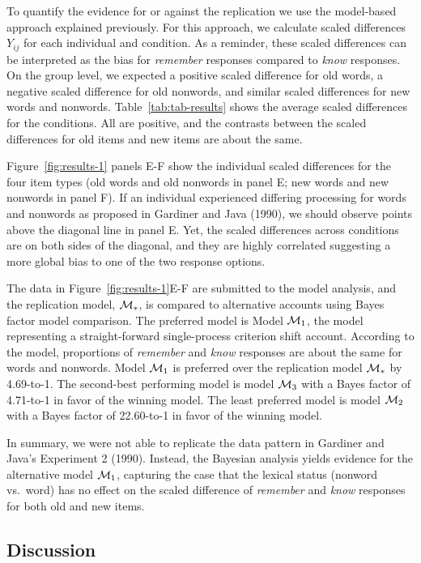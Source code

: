 \documentclass[english,,man]{apa6}
\begin{document}
To quantify the evidence for or against the replication we use the model-based approach explained previously. For this approach, we calculate scaled differences \(Y_{ij}\) for each individual and condition. As a reminder, these scaled differences can be interpreted as the bias for \emph{remember} responses compared to \emph{know} responses. On the group level, we expected a positive scaled difference for old words, a negative scaled difference for old nonwords, and similar scaled differences for new words and nonwords. Table~\ref{tab:tab-results} shows the average scaled differences for the conditions. All are positive, and the contrasts between the scaled differences for old items and new items are about the same.

Figure~\ref{fig:results-1} panels E-F show the individual scaled differences for the four item types (old words and old nonwords in panel E; new words and new nonwords in panel F). If an individual experienced differing processing for words and nonwords as proposed in Gardiner and Java (1990), we should observe points above the diagonal line in panel E. Yet, the scaled differences across conditions are on both sides of the diagonal, and they are highly correlated suggesting a more global bias to one of the two response options.

The data in Figure~\ref{fig:results-1}E-F are submitted to the model analysis, and the replication model, \({\cal M}_{*}\), is compared to alternative accounts using Bayes factor model comparison. The preferred model is Model \({\cal M}_{1}\), the model representing a straight-forward single-process criterion shift account. According to the model, proportions of \emph{remember} and \emph{know} responses are about the same for words and nonwords. Model \({\cal M}_{1}\) is preferred over the replication model \({\cal M}_{*}\) by 4.69-to-1. The second-best performing model is model \({\cal M}_3\) with a Bayes factor of 4.71-to-1 in favor of the winning model. The least preferred model is model \({\cal M}_2\) with a Bayes factor of 22.60-to-1 in favor of the winning model.

In summary, we were not able to replicate the data pattern in Gardiner and Java's Experiment 2 (1990). Instead, the Bayesian analysis yields evidence for the alternative model \({\cal M}_1\), capturing the case that the lexical status (nonword vs.~word) has no effect on the scaled difference of \emph{remember} and \emph{know} responses for both old and new items.

\hypertarget{discussion}{%
\subsection{Discussion}\label{discussion}}
\end{document}
